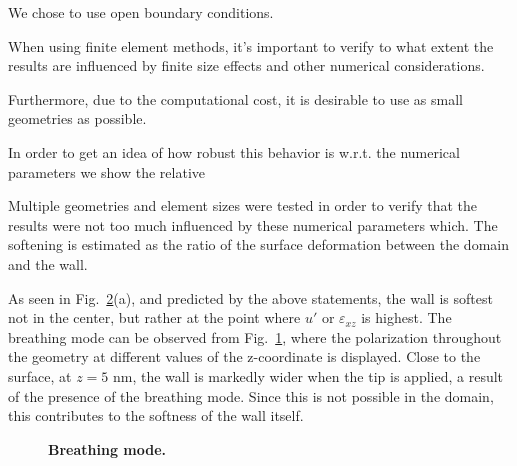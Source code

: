 We chose to use open boundary conditions.

When using finite element methods, it's important to verify to what extent the results are influenced by finite size effects and other numerical considerations.


Furthermore, due to the computational cost, it is desirable to use as small geometries as possible.

In order to get an idea of how robust this behavior is w.r.t. the numerical parameters we show the relative 

Multiple geometries and element sizes were tested in order to verify that the results were not too much influenced by these numerical parameters which. 
The softening is estimated as the ratio of the surface deformation between the domain and the wall.

As seen in Fig.~\ref{fig:BTO_theory}(a), and predicted by the above statements, the wall is softest not in the center, but rather at the point where $u'$ or $\varepsilon_{xz}$ is highest.
The breathing mode can be observed from Fig.~\ref{fig:BTO_breathing}, where the polarization throughout the geometry at different values of the z-coordinate is displayed.
Close to the surface, at $z=5$ nm, the wall is markedly wider when the tip is applied, a result of the presence of the breathing mode.
Since this is not possible in the domain, this contributes to the softness of the wall itself.
\begin{figure}
	\caption{{\bf Breathing mode.} \label{fig:BTO_breathing}}
\end{figure}
\begin{figure}
	\caption{\label{fig:BTO_theory}}
\end{figure}


\printbibliography
